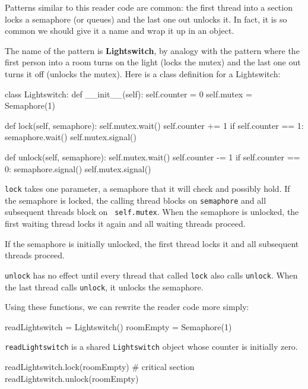 \documentclass{book}
\begin{document}
Patterns similar to this reader code are common: the first thread into
a section locks a semaphore (or queues) and the last one out unlocks
it.  In fact, it is so common we should give it a name and wrap it up
in an object.

The name of the pattern is {\bf Lightswitch}, by analogy with the
pattern where the first person into a room turns on the light (locks
the mutex) and the last one out turns it off (unlocks the mutex).
Here is a class definition for a Lightswitch:

\begin{unbreakable}[title={Lightswitch definition}]{}
class Lightswitch:
    def __init__(self):
        self.counter = 0
        self.mutex = Semaphore(1)

    def lock(self, semaphore):
        self.mutex.wait()
            self.counter += 1
            if self.counter == 1:
                semaphore.wait()
        self.mutex.signal()

    def unlock(self, semaphore):
        self.mutex.wait()
            self.counter -= 1
            if self.counter == 0:
                semaphore.signal()
        self.mutex.signal()
\end{unbreakable}

{\tt lock} takes one parameter, a semaphore that it will check and
possibly hold.  If the semaphore is locked, the calling thread blocks
on {\tt semaphore} and all subsequent threads block on {\tt
        self.mutex}.  When the semaphore is unlocked, the first waiting thread
locks it again and all waiting threads proceed.

If the semaphore is initially unlocked, the first thread locks it
and all subsequent threads proceed.

    {\tt unlock} has no effect until every thread that called {\tt lock}
also calls {\tt unlock}.  When the last thread calls {\tt unlock}, it
unlocks the semaphore.


Using these functions, we can rewrite the reader code
more simply:

\begin{unbreakable}[title={Readers-writers initialization}]{}
readLightswitch = Lightswitch()
roomEmpty = Semaphore(1)
\end{unbreakable}

{\tt readLightswitch} is a shared {\tt Lightswitch} object whose counter
is initially zero.

\begin{unbreakable}[title={Readers-writers solution (reader)}]{}
readLightswitch.lock(roomEmpty)
# critical section
readLightswitch.unlock(roomEmpty)
\end{unbreakable}
\end{document}
